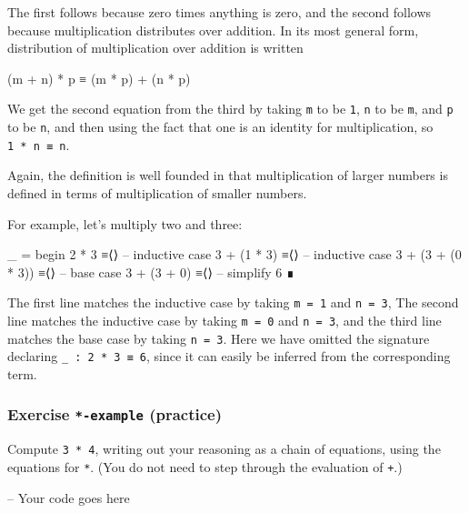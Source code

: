 The first follows because zero times anything is zero, and the second
follows because multiplication distributes over addition. In its most
general form, distribution of multiplication over addition is written

\begin{myDisplay}
(m + n) * p  ≡  (m * p) + (n * p)
\end{myDisplay}

We get the second equation from the third by taking \texttt{m} to be
\texttt{1}, \texttt{n} to be \texttt{m}, and \texttt{p} to be
\texttt{n}, and then using the fact that one is an identity for
multiplication, so \texttt{1\ *\ n\ ≡\ n}.

Again, the definition is well founded in that multiplication of larger
numbers is defined in terms of multiplication of smaller numbers.

For example, let's multiply two and three:

\begin{fence}
\begin{code}
_ =
  begin
    2 * 3
  ≡⟨⟩    -- inductive case
    3 + (1 * 3)
  ≡⟨⟩    -- inductive case
    3 + (3 + (0 * 3))
  ≡⟨⟩    -- base case
    3 + (3 + 0)
  ≡⟨⟩    -- simplify
    6
  ∎
\end{code}
\end{fence}

The first line matches the inductive case by taking \texttt{m\ =\ 1} and
\texttt{n\ =\ 3}, The second line matches the inductive case by taking
\texttt{m\ =\ 0} and \texttt{n\ =\ 3}, and the third line matches the
base case by taking \texttt{n\ =\ 3}. Here we have omitted the signature
declaring \texttt{\_\ :\ 2\ *\ 3\ ≡\ 6}, since it can easily be inferred
from the corresponding term.

\hypertarget{Naturals-times-example}{%
\subsubsection{\texorpdfstring{Exercise \texttt{*-example}
(practice)}{Exercise *-example (practice)}}\label{Naturals-times-example}}

Compute \texttt{3\ *\ 4}, writing out your reasoning as a chain of
equations, using the equations for \texttt{*}. (You do not need to step
through the evaluation of \texttt{+}.)

\begin{fence}
\begin{code}
-- Your code goes here
\end{code}
\end{fence}

